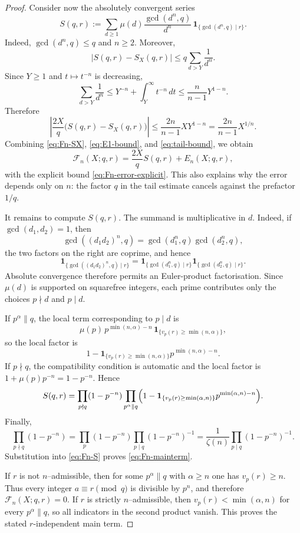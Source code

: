 \documentclass[12pt,a4paper,oneside]{amsart}
\theoremstyle{definition}
\begin{document}
\begin{proof}
Consider now the absolutely convergent series
\[
S(q,r):=
\sum_{d\ge1}
\mu(d)\frac{\gcd(d^n,q)}{d^n}\,
\mathbf 1_{\{\gcd(d^n,q)\mid r\}}.
\]
Indeed, $\gcd(d^n,q)\le q$ and $n\ge2$. Moreover,
\[
|S(q,r)-S_X(q,r)|
\le q\sum_{d>Y}\frac1{d^n}.
\]
Since $Y\ge1$ and $t\mapsto t^{-n}$ is decreasing,
\[
\sum_{d>Y}\frac1{d^n}
\le Y^{-n}+\int_Y^\infty t^{-n}\,dt
\le \frac{n}{n-1}Y^{1-n}.
\]
Therefore
\begin{equation}\label{eq:tail-bound}
\left|\frac{2X}{q}\bigl(S(q,r)-S_X(q,r)\bigr)\right|
\le\frac{2n}{n-1}XY^{1-n}
=\frac{2n}{n-1}X^{1/n}.
\end{equation}
Combining \eqref{eq:Fn-SX}, \eqref{eq:E1-bound}, and \eqref{eq:tail-bound}, we obtain
\begin{equation}\label{eq:Fn-S}
\mathcal F_n(X;q,r)=\frac{2X}{q}S(q,r)+E_n(X;q,r),
\end{equation}
with the explicit bound \eqref{eq:Fn-error-explicit}. This also explains why the error depends
only on $n$: the factor $q$ in the tail estimate cancels against the prefactor $1/q$.

It remains to compute $S(q,r)$. The summand is multiplicative in $d$. Indeed, if
$\gcd(d_1,d_2)=1$, then
\[
\gcd((d_1d_2)^n,q)=\gcd(d_1^n,q)\gcd(d_2^n,q),
\]
the two factors on the right are coprime, and hence
\[
\mathbf 1_{\{\gcd((d_1d_2)^n,q)\mid r\}}
=
\mathbf 1_{\{\gcd(d_1^n,q)\mid r\}}
\mathbf 1_{\{\gcd(d_2^n,q)\mid r\}}.
\]
Absolute convergence therefore permits an Euler-product factorisation. Since $\mu(d)$ is
supported on squarefree integers, each prime contributes only the choices $p\nmid d$ and
$p\mid d$.

If $p^\alpha\parallel q$, the local term corresponding to $p\mid d$ is
\[
\mu(p)\,p^{\min(n,\alpha)-n}\,
\mathbf 1_{\{v_p(r)\ge\min(n,\alpha)\}},
\]
so the local factor is
\[
1-
\mathbf 1_{\{v_p(r)\ge\min(n,\alpha)\}}
 p^{\min(n,\alpha)-n}.
\]
If $p\nmid q$, the compatibility condition is automatic and the local factor is
$1+\mu(p)p^{-n}=1-p^{-n}$. Hence
\[
S(q,r)=
\prod_{p\nmid q}(1-p^{-n})
\prod_{p^\alpha\parallel q}
\Bigl(1-
\mathbf 1_{\{v_p(r)\ge\min(\alpha,n)\}}
 p^{\min(\alpha,n)-n}\Bigr).
\]
Finally,
\[
\prod_{p\nmid q}(1-p^{-n})
=
\prod_p(1-p^{-n})\prod_{p\mid q}(1-p^{-n})^{-1}
=
\frac1{\zeta(n)}\prod_{p\mid q}(1-p^{-n})^{-1}.
\]
Substitution into \eqref{eq:Fn-S} proves \eqref{eq:Fn-mainterm}.

If $r$ is not $n$--admissible, then for some $p^\alpha\parallel q$ with $\alpha\ge n$ one has
$v_p(r)\ge n$. Thus every integer $a\equiv r\pmod q$ is divisible by $p^n$, and therefore
$\mathcal F_n(X;q,r)=0$. If $r$ is strictly $n$--admissible, then
$v_p(r)<\min(\alpha,n)$ for every $p^\alpha\parallel q$, so all indicators in the second
product vanish. This proves the stated $r$-independent main term.
\end{proof}
\end{document}
